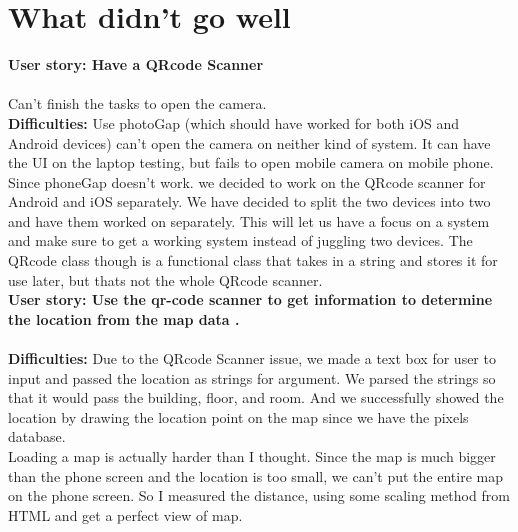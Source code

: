 \documentclass[12pt]{article}
\begin{document}
\section{What didn't go well}


\textbf{User story: Have a QR­code Scanner} \\ \\
Can't finish the tasks to open the camera.  \\

\textbf{Difficulties: } Use photoGap (which should have worked for both iOS and Android devices) can’t open the camera on neither kind of system. It can have the UI on the laptop testing, but fails to open mobile camera on mobile phone. Since phoneGap doesn’t work. we decided to work on the QRcode scanner for Android and iOS separately.  We have decided to split the two devices into two and have them worked on separately. This will let us have a focus on a system and make sure to get a working system instead of juggling two devices. The QRcode class though is a functional class that takes in a string and stores it for use later, but thats not the whole QRcode scanner.\\

\textbf{User story: Use the qr-code scanner to get information to determine the location from the map data
.} \\ \\
\textbf{Difficulties: }Due to the QRcode Scanner issue, we made a text box for user to input and passed the location as strings for argument. We parsed the strings so that it would pass the building, floor, and room. And we successfully showed the location by drawing the location point on the map since we have the pixels database. \\

Loading a map is actually harder than I thought. Since the map is much bigger than the phone screen and the location is too small, we can’t put the entire map on the phone screen. So I measured the distance, using some scaling method from HTML and get a perfect view of map. \\
\end{document}
